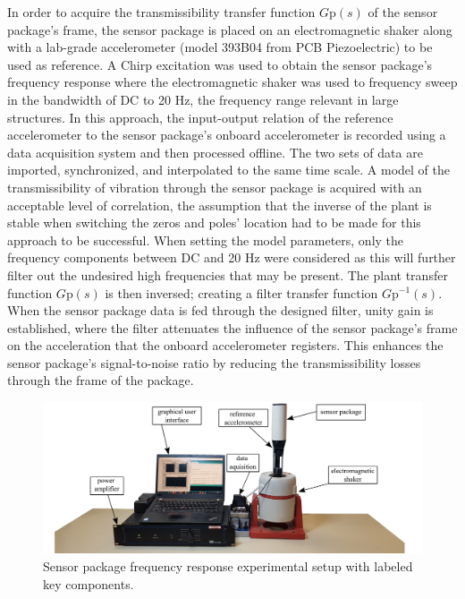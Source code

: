 \documentclass[]{spie}  %
\begin{document}
	In order to acquire the transmissibility transfer function $G$p$(s)$ of the sensor package’s frame, the sensor package is placed on an electromagnetic shaker along with a lab-grade accelerometer (model 393B04 from PCB Piezoelectric) to be used as reference. A Chirp excitation was used to obtain the sensor package’s frequency response where the electromagnetic shaker was used to frequency sweep in the bandwidth of DC to 20 Hz, the frequency range relevant in large structures. In this approach, the input-output relation of the reference accelerometer to the sensor package’s onboard accelerometer is recorded using a data acquisition system and then processed offline. The two sets of data are imported, synchronized, and interpolated to the same time scale. A model of the transmissibility of vibration through the sensor package is acquired with an acceptable level of correlation, the assumption that the inverse of the plant is stable when switching the zeros and poles’ location had to be made for this approach to be successful. When setting the model parameters, only the frequency components between DC and 20 Hz were considered as this will further filter out the undesired high frequencies that may be present. The plant transfer function $G$p$(s)$ is then inversed; creating a filter transfer function $G$p$^{-1}(s)$. When the sensor package data is fed through the designed filter, unity gain is established, where the filter attenuates the influence of the sensor package’s frame on the acceleration that the onboard accelerometer registers. This enhances the sensor package’s signal-to-noise ratio by reducing the transmissibility losses through the frame of the package. 
	
	\begin{figure} [H]
		\centering
		\includegraphics[width=6 in]{figures/benchtop_experimental_setup}
		\caption{Sensor package frequency response experimental setup with labeled key components.} 
		\label{fig:bench top experimental setup}
		
	\end{figure} 
\end{document}
